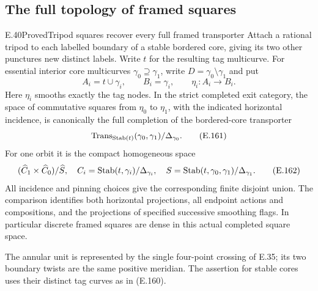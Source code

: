 \subsection{The full topology of framed squares}

\begin{result}{E.40}{Proved}{Tripod squares recover every full framed transporter}
Attach a rational tripod to each labelled boundary of a stable
bordered core, giving its two other punctures new distinct labels.
Write $t$ for the resulting tag multicurve.  For essential interior
core multicurves $\gamma_0\supseteq\gamma_1$, write
$D=\gamma_0\setminus\gamma_1$ and put
\[
 A_i=t\cup\gamma_i,\qquad B_i=\gamma_i,
 \qquad \eta_i:A_i\longrightarrow B_i.                       \tag{E.160}
\]
Here $\eta_i$ smooths exactly the tag nodes.  In the strict completed
exit category, the space of commutative squares from $\eta_0$ to
$\eta_1$, with the indicated horizontal incidence, is canonically
the full completion of the bordered-core transporter
\[
 \operatorname{Trans}_{\operatorname{Stab}(t)}(\gamma_0,\gamma_1)
                         /\Delta_{\gamma_0}.                 \tag{E.161}
\]
For one orbit it is the compact homogeneous space
\[
 (\widehat C_1\times\widehat C_0)/\widehat S,
 \quad C_i=\operatorname{Stab}(t,\gamma_i)/\Delta_{\gamma_i},\quad
 S=\operatorname{Stab}(t,\gamma_0,\gamma_1)/\Delta_{\gamma_1}.               \tag{E.162}
\]
All incidence and pinning choices give the corresponding finite
disjoint union.  The comparison identifies both horizontal
projections, all endpoint actions and compositions, and the
projections of specified successive smoothing flags.  In particular discrete framed squares
are dense in this actual completed square space.

The annular unit is represented by the single four-point crossing
of E.35; its two boundary twists are the same positive meridian.
The assertion for stable cores uses their distinct tag curves as
in (E.160).
\end{result}
